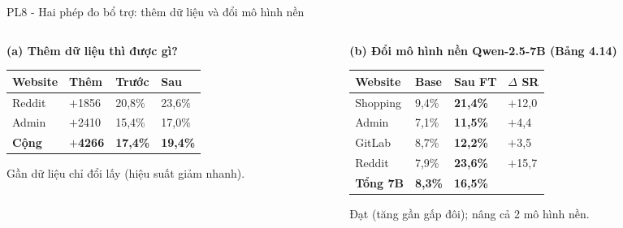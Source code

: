 \begin{frame}{PL8 - Hai phép đo bổ trợ: thêm dữ liệu và đổi mô hình nền}
  \begin{columns}[t]
    \begin{column}{0.48\textwidth}
      \textbf{(a) Thêm dữ liệu thì được gì?}
      \vspace{0.04cm}
      \centering
      \setlength{\tabcolsep}{1pt}
      \begin{tabular}{@{}L{1.4cm} C{1.15cm} C{1.15cm} C{1.15cm}@{}}
        \toprule
        \textbf{Website} & \textbf{Thêm} & \textbf{Trước} & \textbf{Sau} \\
        \midrule
        Reddit & $+$1856 & 20,8\% & 23,6\% \\
        Admin & $+$2410 & 15,4\% & 17,0\% \\
        \midrule
        \textbf{Cộng} & \textbf{$+$4266} & \textbf{17,4\%} & \textbf{19,4\%} \\
        \bottomrule
      \end{tabular}
      \vspace{0.04cm}

      \raggedright
      {\scriptsize Gần  dữ liệu chỉ đổi lấy  (hiệu suất giảm nhanh).}
    \end{column}
    \hfill
    \begin{column}{0.48\textwidth}
      \textbf{(b) Đổi mô hình nền Qwen-2.5-7B (Bảng 4.14)}
      \vspace{0.04cm}
      \scriptsize
      \setlength{\tabcolsep}{1pt}
      \begin{tabular}{@{}L{1.4cm} C{1.0cm} C{1.0cm} C{0.9cm}@{}}
        \toprule
        \textbf{Website} & \textbf{Base} & \textbf{Sau FT} & \textbf{$\Delta$ SR} \\
        \midrule
        Shopping & 9,4\% & \textbf{21,4\%} & $+$12,0 \\
        Admin & 7,1\% & \textbf{11,5\%} & $+$4,4 \\
        GitLab & 8,7\% & \textbf{12,2\%} & $+$3,5 \\
        Reddit & 7,9\% & \textbf{23,6\%} & $+$15,7 \\
        \midrule
        \textbf{Tổng 7B} & \textbf{8,3\%} & \textbf{16,5\%} &  \\
        \bottomrule
      \end{tabular}
      \vspace{0.04cm}

      \raggedright
      {\scriptsize Đạt  (tăng gần gấp đôi); nâng cả 2 mô hình nền.}
    \end{column}
  \end{columns}
\end{frame}





